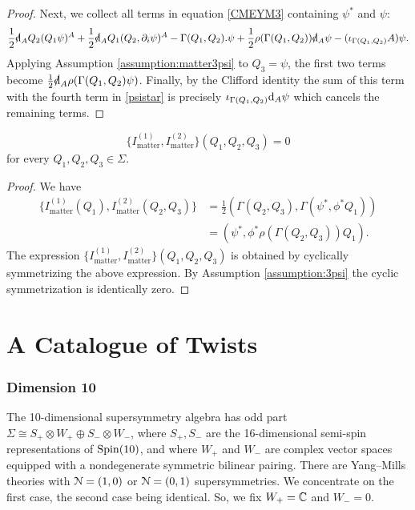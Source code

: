 \documentclass[10pt, oneside]{article}
\newcommand{\matter}{\mathrm{matter}}
\begin{document}
\begin{proof}
Next, we collect all terms in equation \eqref{CMEYM3} containing $\psi^*$ and $\psi$:
\begin{equation}\label{psistar}
\frac{1}{2} \sd \d_A Q_2(Q_1 \psi)^A + \frac{1}{2} \sd \d_A Q_1(Q_2, \partial_i\psi)^A - \Gamma(Q_1,Q_2) . \psi + \frac{1}{2} \rho(\Gamma(Q_1,Q_2)) \sd \d_A \psi - (\iota_{\Gamma(Q_1, Q_2)} A)\psi.
\end{equation}
Applying Assumption \ref{assumption:matter3psi} to $Q_3 = \psi$, the first two terms become $\frac{1}{2} \sd \d_A \rho(\Gamma(Q_1,Q_2) \psi)$. 
Finally, by the Clifford identity the sum of this term with the fourth term in \eqref{psistar} is precisely $\iota_{\Gamma(Q_1,Q_2)}{\rm d}_A \psi$ which cancels the remaining terms.
\end{proof}

\begin{lemma}
\[\{I_{\matter}^{(1)}, I_{\matter}^{(2)}\}(Q_1, Q_2, Q_3) = 0\]
for every $Q_1, Q_2, Q_3\in \Sigma$.
\end{lemma}
\begin{proof}
We have
\begin{align*}
\{I_{\matter}^{(1)}(Q_1), I_{\matter}^{(2)}(Q_2, Q_3)\} & = \frac{1}{2} (\Gamma(Q_2, Q_3), \Gamma(\psi^*, \phi^* Q_1)) \\ & = (\psi^*, \phi^* \rho(\Gamma(Q_2,Q_3)) Q_1)  .
\end{align*}
The expression
$\{I_{\matter}^{(1)}, I_{\matter}^{(2)}\}(Q_1,Q_2,Q_3)$ is obtained by cyclically symmetrizing the above expression. By Assumption \ref{assumption:3psi} the cyclic symmetrization is identically zero.
\end{proof}

\part{A Catalogue of Twists}

\section{Dimension 10}

The 10-dimensional supersymmetry algebra has odd part $\Sigma\cong S_+\otimes W_+\oplus S_-\otimes W_-$, where $S_+, S_-$ are the 16-dimensional semi-spin representations of $\mathrm{Spin}(10)$, and where $W_+$ and $W_-$ are complex vector spaces equipped with a nondegenerate symmetric bilinear pairing. There are Yang--Mills theories with $\mathcal N=(1, 0)$ or $\mathcal N=(0, 1)$ supersymmetries. We concentrate on the first case, the second case being identical. So, we fix $W_+=\mathbb C$ and $W_- = 0$.
\end{document}
